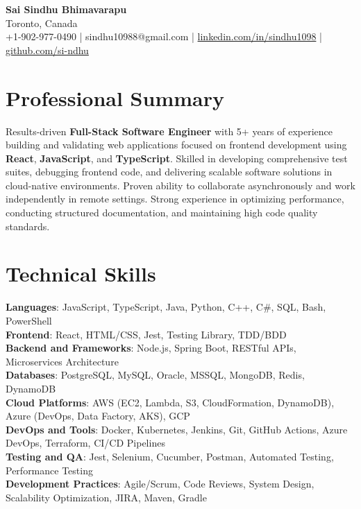 \documentclass[letterpaper,11pt]{article}
\begin{document}
\begin{center}
  {\Large \textbf{Sai Sindhu Bhimavarapu}} \\
  Toronto, Canada \\
  +1-902-977-0490 \enspace | \enspace sindhu10988@gmail.com \enspace | \enspace \href{https://www.linkedin.com/in/sindhu1098/}{linkedin.com/in/sindhu1098} \enspace | \enspace \href{https://github.com/si-ndhu}{github.com/si-ndhu}
\end{center}

\section{Professional Summary}
  \begin{itemize}[leftmargin=0.15in, label={}]
    \small{\item{
     Results-driven \textbf{Full-Stack Software Engineer} with 5+ years of experience building and validating web applications focused on frontend development using \textbf{React}, \textbf{JavaScript}, and \textbf{TypeScript}. Skilled in developing comprehensive test suites, debugging frontend code, and delivering scalable software solutions in cloud-native environments. Proven ability to collaborate asynchronously and work independently in remote settings. Strong experience in optimizing performance, conducting structured documentation, and maintaining high code quality standards.
    }}
  \end{itemize}
\vspace{-16pt}

\section{Technical Skills}
 \begin{itemize}[leftmargin=0.15in, label={}]
    \small{\item{
     \textbf{Languages}: JavaScript, TypeScript, Java, Python, C++, C\#, SQL, Bash, PowerShell \\
     \textbf{Frontend}: React, HTML/CSS, Jest, Testing Library, TDD/BDD \\
     \textbf{Backend and Frameworks}: Node.js, Spring Boot, RESTful APIs, Microservices Architecture \\
     \textbf{Databases}: PostgreSQL, MySQL, Oracle, MSSQL, MongoDB, Redis, DynamoDB \\
     \textbf{Cloud Platforms}: AWS (EC2, Lambda, S3, CloudFormation, DynamoDB), Azure (DevOps, Data Factory, AKS), GCP \\
     \textbf{DevOps and Tools}: Docker, Kubernetes, Jenkins, Git, GitHub Actions, Azure DevOps, Terraform, CI/CD Pipelines \\
     \textbf{Testing and QA}: Jest, Selenium, Cucumber, Postman, Automated Testing, Performance Testing \\
     \textbf{Development Practices}: Agile/Scrum, Code Reviews, System Design, Scalability Optimization, JIRA, Maven, Gradle
    }}
 \end{itemize}
\vspace{-16pt}
\end{document}
